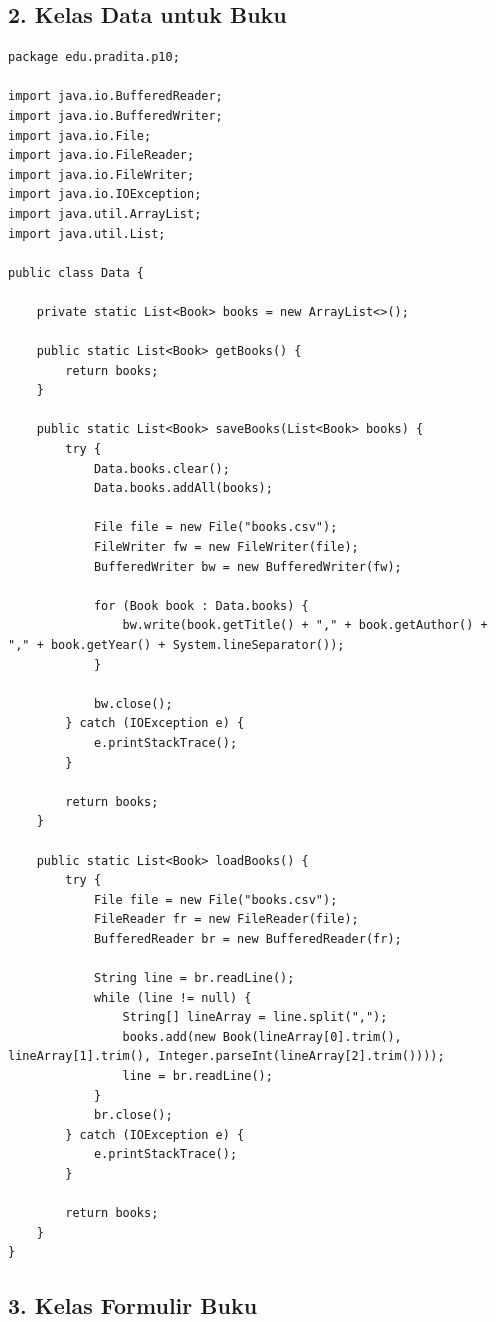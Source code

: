 \subsection{2. Kelas Data untuk Buku}

\begin{lstlisting}[style=JavaStyle]
package edu.pradita.p10;

import java.io.BufferedReader;
import java.io.BufferedWriter;
import java.io.File;
import java.io.FileReader;
import java.io.FileWriter;
import java.io.IOException;
import java.util.ArrayList;
import java.util.List;

public class Data {
	
	private static List<Book> books = new ArrayList<>();
	
	public static List<Book> getBooks() {
		return books;
	}
	
	public static List<Book> saveBooks(List<Book> books) {
		try {
			Data.books.clear();
			Data.books.addAll(books);
			
			File file = new File("books.csv");
			FileWriter fw = new FileWriter(file);
			BufferedWriter bw = new BufferedWriter(fw);
			
			for (Book book : Data.books) {
				bw.write(book.getTitle() + "," + book.getAuthor() + "," + book.getYear() + System.lineSeparator());
			}
			
			bw.close();
		} catch (IOException e) {
			e.printStackTrace();
		}
		
		return books;
	}
	
	public static List<Book> loadBooks() {
		try {
			File file = new File("books.csv");
			FileReader fr = new FileReader(file);
			BufferedReader br = new BufferedReader(fr);
			
			String line = br.readLine();
			while (line != null) {
				String[] lineArray = line.split(",");
				books.add(new Book(lineArray[0].trim(), lineArray[1].trim(), Integer.parseInt(lineArray[2].trim())));
				line = br.readLine();
			}
			br.close();
		} catch (IOException e) {
			e.printStackTrace();
		}
		
		return books;
	}
}
\end{lstlisting}

\subsection{3. Kelas Formulir Buku}

